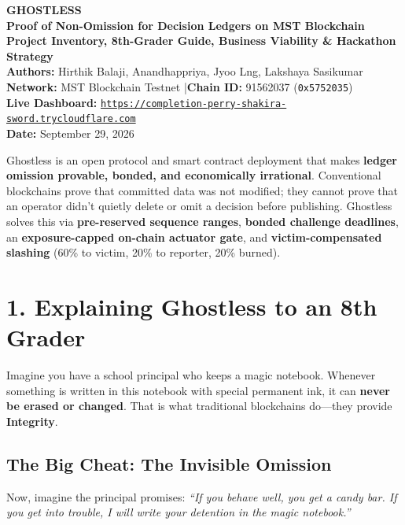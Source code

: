 \documentclass[11pt,a4paper]{article}
\begin{document}
\begin{center}
    {\Huge \textbf{\color{primary} GHOSTLESS}}\\[6pt]
    {\LARGE \textbf{Proof of Non-Omission for Decision Ledgers on MST Blockchain}}\\[10pt]
    {\large \textbf{Project Inventory, 8th-Grader Guide, Business Viability \& Hackathon Strategy}}\\[14pt]
    \textbf{Authors:} Hirthik Balaji, Anandhappriya, Jyoo Lng, Lakshaya Sasikumar\\
    \textbf{Network:} MST Blockchain Testnet \quad|\quad \textbf{Chain ID:} 91562037 (\texttt{0x5752035})\\
    \textbf{Live Dashboard:} \href{https://completion-perry-shakira-sword.trycloudflare.com}{\texttt{https://completion-perry-shakira-sword.trycloudflare.com}}\\
    \textbf{Date:} September 29, 2026
\end{center}

\vspace{10pt}

\begin{tcolorbox}[colframe=secondary, title=\textbf{Executive Summary}]
Ghostless is an open protocol and smart contract deployment that makes \textbf{ledger omission provable, bonded, and economically irrational}. Conventional blockchains prove that committed data was not modified; they cannot prove that an operator didn't quietly delete or omit a decision before publishing. Ghostless solves this via \textbf{pre-reserved sequence ranges}, \textbf{bonded challenge deadlines}, an \textbf{exposure-capped on-chain actuator gate}, and \textbf{victim-compensated slashing} (60\% to victim, 20\% to reporter, 20\% burned).
\end{tcolorbox}

\section{1. Explaining Ghostless to an 8th Grader}

Imagine you have a school principal who keeps a magic notebook. 
Whenever something is written in this notebook with special permanent ink, it can \textbf{never be erased or changed}. That is what traditional blockchains do—they provide \textbf{Integrity}.

\subsection{The Big Cheat: The Invisible Omission}
Now, imagine the principal promises: \textit{``If you behave well, you get a candy bar. If you get into trouble, I will write your detention in the magic notebook.''}
\end{document}
